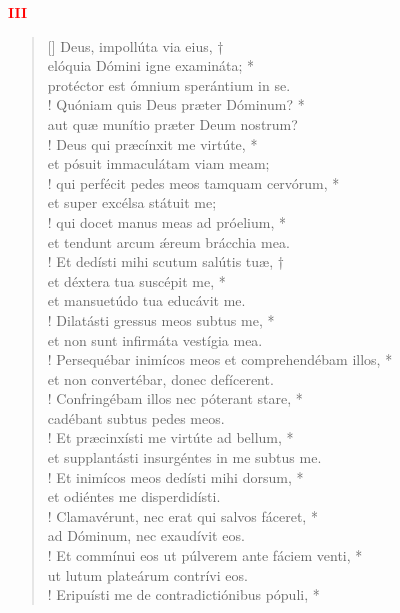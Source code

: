 \begin{center}
\textcolor{red}{\bf III}\\
\end{center}
\begin{verse}[\versewidth]
\vin Deus, impollúta via eius, †\\
\vin elóquia Dómini igne examináta; *\\
\vin protéctor est ómnium sperántium in se.\\!
Quóniam quis Deus præter Dóminum? *\\
aut quæ munítio præter Deum nostrum?\\!
\vin Deus qui præcínxit me virtúte, *\\
\vin et pósuit immaculátam viam meam;\\!
qui perfécit pedes meos tamquam cervórum, *\\
et super excélsa státuit me;\\!
\vin qui docet manus meas ad próelium, *\\
\vin et tendunt arcum \'{æ}reum brácchia mea.\\!
Et dedísti mihi scutum salútis tuæ, †\\
et déxtera tua suscépit me, *\\
et mansuetúdo tua educávit me.\\!
\vin Dilatásti gressus meos subtus me, *\\
\vin et non sunt infirmáta vestígia mea.\\!
Persequébar inimícos meos et comprehendébam illos, *\\
et non convertébar, donec defícerent.\\!
\vin Confringébam illos nec póterant stare, *\\
\vin cadébant subtus pedes meos.\\!
Et præcinxísti me virtúte ad bellum, *\\
et supplantásti insurgéntes in me subtus me.\\!
\vin Et inimícos meos dedísti mihi dorsum, *\\
\vin et odiéntes me disperdidísti.\\!
Clamavérunt, nec erat qui salvos fáceret, *\\
ad Dóminum, nec exaudívit eos.\\!
\vin Et commínui eos ut púlverem ante fáciem venti, *\\
\vin ut lutum plateárum contrívi eos.\\!
Eripuísti me de contradictiónibus pópuli, *\\

\end{verse}
